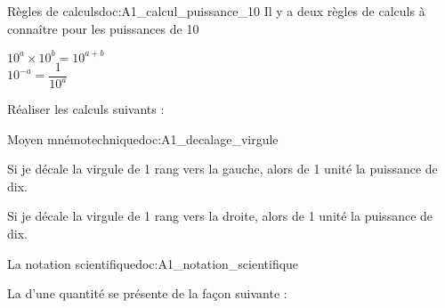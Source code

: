 \begin{doc}{Règles de calculs}{doc:A1_calcul_puissance_10}
  Il y a deux règles de calculs à connaître pour les puissances de 10
  \begin{encart}
    \pointCyan $10^a \times 10^b = 10^{a + b}$ \\   
    \pointCyan $10^{-a} = \dfrac{1}{10^a}$
  \end{encart}
\end{doc}


\numeroQuestion Réaliser les calculs suivants :\\[8pt]


\begin{doc}{Moyen mnémotechnique}{doc:A1_decalage_virgule}
  \begin{listePoints}
    \item Si je décale la virgule de 1 rang vers la gauche, alors
     de 1 unité la puissance de dix.
    \item Si je décale la virgule de 1 rang vers la droite, alors
     de 1 unité la puissance de dix.
  \end{listePoints}
\end{doc}



\begin{doc}{La notation scientifique}{doc:A1_notation_scientifique}
  \begin{encart}
  La  d'une quantité se présente de la façon suivante :
  \begin{center}
    \qq{}
    \qq{}
  \end{center}
  \vspace*{-30pt} \hspace*{4pt}
  \end{encart}
\end{doc}


